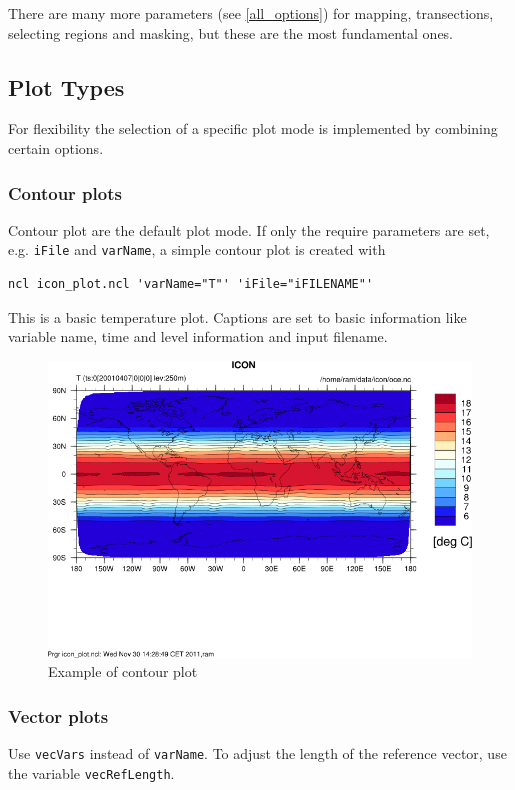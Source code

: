 There are many more parameters (see \ref{all_options}) for mapping, transections, selecting regions and masking, but these are the most fundamental ones.

\subsection{Plot Types}
For flexibility the selection of a specific plot mode is implemented by combining certain options.

\subsubsection{Contour plots}
Contour plot are the default plot mode. If only the require parameters are set, e.g. {\tt iFile} and {\tt varName}, a simple contour plot is created with

\begin{small}
\begin{verbatim}
ncl icon_plot.ncl 'varName="T"' 'iFile="iFILENAME"'
\end{verbatim}
\end{small}

This is a basic temperature plot. Captions are set to basic information like variable name, time and level information and input filename.

\begin{figure}[h!]%
\centering
\includegraphics[width=0.95\linewidth]{pictures/contour_plot.png}
\caption{Example of contour plot}\label{fig:contour-plot}
\end{figure}

\subsubsection{Vector plots}
Use {\tt vecVars} instead of {\tt varName}. To adjust the length of the reference vector, use the variable {\tt vecRefLength}.

